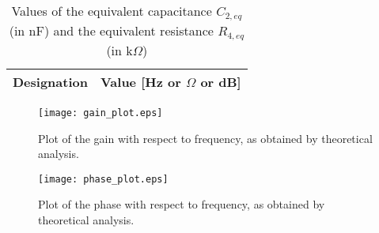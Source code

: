 \begin{table}[H]
  \centering
  \begin{tabular}{|c|c|}
    \hline    
    {\bf Designation} & {\bf Value [Hz or $\Omega$ or dB]} \\ \hline
    
  \end{tabular}
  \caption{Values of the equivalent capacitance $C_{2,eq}$ (in nF) and the equivalent resistance $R_{4,eq}$ (in k$\Omega$)}
  \label{tab:final_values}
\end{table}


\begin{figure}[H] \centering
  \texttt{[image: gain\_plot.eps]}
  \caption{Plot of the gain with respect to frequency, as obtained by theoretical analysis.}
  \label{fig:gain_plot}
\end{figure}

\begin{figure}[H] \centering
  \texttt{[image: phase\_plot.eps]}
  \caption{Plot of the phase with respect to frequency, as obtained by theoretical analysis.}
  \label{fig:phase_plot}
\end{figure}

